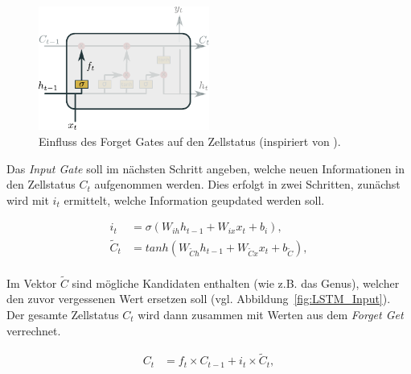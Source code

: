                     \begin{figure}[ht]
                        \centering
                        \includegraphics[width=0.5\textwidth]{images/Illustrationen/LSTM_FG}
                        \caption{Einfluss des Forget Gates auf den Zellstatus (inspiriert von \cite{OLAH2015}).}
                        \label{fig:LSTM_Forget}
                    \end{figure}
                    
                Das \textit{Input Gate} soll im nächsten Schritt angeben, welche neuen Informationen in den Zellstatus $C_t$ aufgenommen werden.
                Dies erfolgt in zwei Schritten, zunächst wird mit $i_t$ ermittelt, welche Information geupdated werden soll.

                \begin{equation}
                    \begin{split}
                        i_t &= \sigma\left(W_{ih}h_{t-1} + W_{ix}x_t + b_i\right), \\
                        \tilde{C}_t &= tanh\left(W_{\tilde{C}h}h_{t-1} + W_{\tilde{C}x}x_t + b_{\tilde{C}}\right),\\
                    \end{split}
                \end{equation}

                Im Vektor $\tilde{C}$ sind mögliche Kandidaten enthalten (wie z.B. das Genus), welcher den zuvor vergessenen Wert ersetzen soll (vgl. Abbildung~\ref{fig:LSTM_Input}).
                Der gesamte Zellstatus $C_t$ wird dann zusammen mit Werten aus dem \textit{Forget Get} verrechnet.

                \begin{equation}
                    \begin{split}
                        C_t &=f_t\times C_{t-1} + i_t\times \tilde{C}_t, \\
                    \end{split}
                \end{equation}

